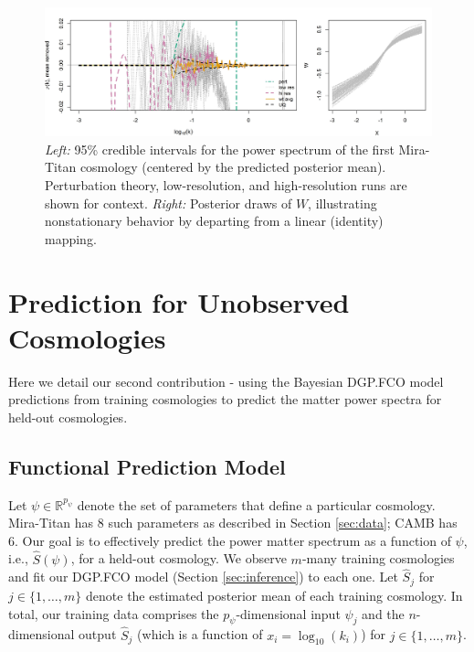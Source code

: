 \documentclass[11pt]{article}
\begin{document}
\begin{figure}[ht]
    \centering
    \includegraphics[width=6in]{plot_fit.jpeg}
    \caption{{\it Left:} 95\% credible intervals for the power spectrum of the first Mira-Titan
    cosmology (centered by the predicted posterior mean). Perturbation theory, 
    low-resolution, and high-resolution runs are shown for context. {\it Right:} Posterior draws
    of $W$, illustrating nonstationary behavior by departing from a linear (identity) mapping.}
    \label{fig:plot_fit}
\end{figure}

\section{Prediction for Unobserved Cosmologies}
\label{sec:pred}

Here we detail our second contribution - using the Bayesian DGP.FCO model predictions
from training cosmologies to predict the matter power spectra for held-out cosmologies. 

\subsection{Functional Prediction Model}
\label{subsec:pca}

Let $\psi \in \mathbb{R}^{p_\psi}$ denote the set of parameters that define a particular cosmology.
Mira-Titan has 8 such parameters as described in Section \ref{sec:data}; CAMB has 6.
Our goal is to effectively predict the power matter spectrum as a function of $\psi$, i.e., $\hat{S}(\psi)$, 
for a held-out cosmology.  We observe $m$-many training cosmologies and fit our DGP.FCO 
model (Section \ref{sec:inference}) to each one.  Let $\hat{S}_j$ for $j \in \{1,\ldots,m\}$ denote
the estimated posterior mean of each training cosmology.  In total, our training data comprises
the $p_\psi$-dimensional input $\psi_j$ and the $n$-dimensional output $\hat{S}_j$ (which is a 
function of $x_i = \log_{10}(k_i)$) for $j \in \{1,\ldots,m\}$.
\end{document}
